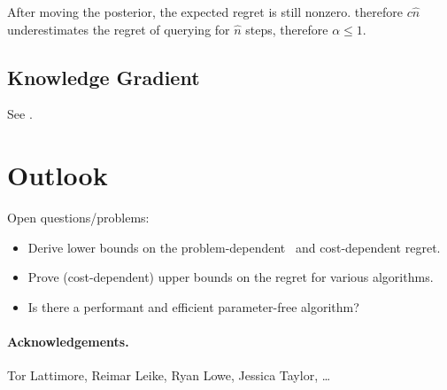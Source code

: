 \documentclass[a4paper]{article}
\begin{document}
After moving the posterior,
the expected regret is still nonzero.
therefore $c\hat{n}$ underestimates the regret
of querying for $\hat{n}$ steps,
therefore $\alpha \leq 1$.


\subsection{Knowledge Gradient}

See \citet[Sec.~5.2]{PowellRyzhov12}.




\section{Outlook}

Open questions/problems:
\begin{itemize}
\item Derive lower bounds on the problem-dependent~\citep[Thm.~2.2]{Bubeck12}
    and cost-dependent regret.
\item Prove (cost-dependent) upper bounds
    on the regret for various algorithms.
\item Is there a performant and efficient parameter-free algorithm?
\end{itemize}


\paragraph{Acknowledgements.}
Tor Lattimore, Reimar Leike, Ryan Lowe, Jessica Taylor, \dots


\end{document}

